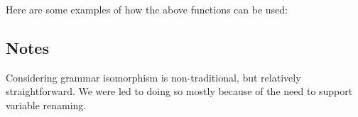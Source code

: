 Here are some examples of how the above functions can be used:


\subsection{Notes}

Considering grammar isomorphism is non-traditional, but relatively
straightforward.  We were led to doing so mostly because of the need to
support variable renaming.

%
%

